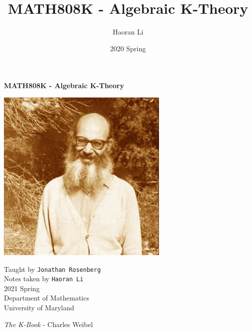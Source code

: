 \documentclass[a4paper,10pt]{article}
\title{MATH808K - Algebraic K-Theory} %
\author{Haoran Li}
\date{2020 Spring}
\begin{document}
\sloppy %

\begin{titlepage}
\begin{center}
\vspace*{1cm}
\Huge
\textbf{MATH808K - Algebraic K-Theory} \\
\vspace{2cm}
\begin{center}
\includegraphics{Pictures/Grothendieck.jpg}
\end{center}
\vspace{2cm}
\normalsize
Taught by \texttt{Jonathan Rosenberg} \\
Notes taken by \texttt{Haoran Li} \\
2021 Spring \\
\vspace{2cm}
Department of Mathematics\\
University of Maryland\\
\end{center}
\end{titlepage}

\tableofcontents
\newpage


\begin{thebibliography}{}

\textit{The K-Book} - Charles Weibel

\end{thebibliography}

\printindex
\newpage
\end{document}
